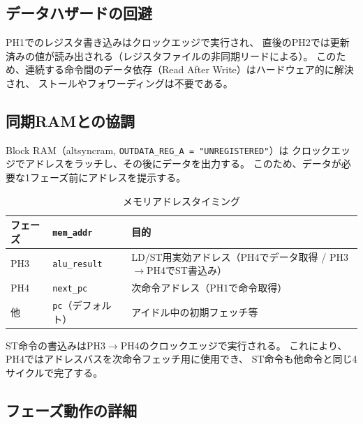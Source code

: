 \documentclass[a4paper,11pt]{ltjsarticle}
\begin{document}
\subsection{データハザードの回避}

PH1でのレジスタ書き込みはクロックエッジで実行され、
直後のPH2では更新済みの値が読み出される（レジスタファイルの非同期リードによる）。
このため、連続する命令間のデータ依存（Read After Write）はハードウェア的に解決され、
ストールやフォワーディングは不要である。

\subsection{同期RAMとの協調}

Block RAM（altsyncram, \texttt{OUTDATA\_REG\_A = "UNREGISTERED"}）は
クロックエッジでアドレスをラッチし、その後にデータを出力する。
このため、データが必要な1フェーズ前にアドレスを提示する。

\begin{table}[h]
\centering
\caption{メモリアドレスタイミング}
\begin{tabular}{lll}
\toprule
フェーズ & \texttt{mem\_addr} & 目的 \\
\midrule
PH3 & \texttt{alu\_result} & LD/ST用実効アドレス（PH4でデータ取得 / PH3$\to$PH4でST書込み） \\
PH4 & \texttt{next\_pc}    & 次命令アドレス（PH1で命令取得） \\
他  & \texttt{pc}（デフォルト） & アイドル中の初期フェッチ等 \\
\bottomrule
\end{tabular}
\end{table}

ST命令の書込みはPH3$\to$PH4のクロックエッジで実行される。
これにより、PH4ではアドレスバスを次命令フェッチ用に使用でき、
ST命令も他命令と同じ4サイクルで完了する。

\subsection{フェーズ動作の詳細}
\end{document}
